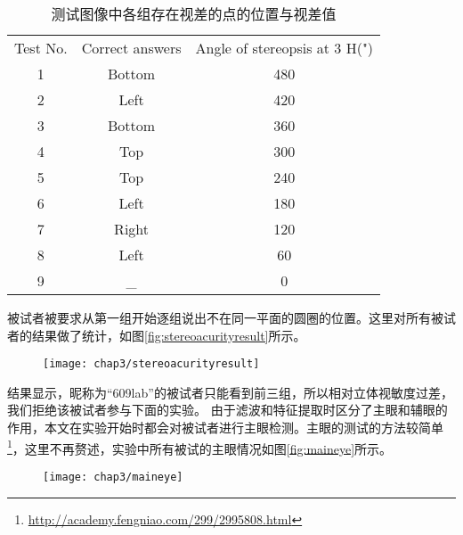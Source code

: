 \begin{table}[]
\centering
\caption{测试图像中各组存在视差的点的位置与视差值}
\label{tab:correctanswer}
\begin{tabular}{|c|c|c|}
\hline
\multirow{2}{*}{Test No.} & \multirow{2}{*}{Correct answers} & \multirow{2}{*}{Angle of stereopsis at 3 H(")} \\
                          &                                  &                                                \\ \hline
1                         & Bottom                           & 480                                            \\ \hline
2                         & Left                             & 420                                            \\ \hline
3                         & Bottom                           & 360                                            \\ \hline
4                         & Top                              & 300                                            \\ \hline
5                         & Top                              & 240                                            \\ \hline
6                         & Left                             & 180                                            \\ \hline
7                         & Right                            & 120                                            \\ \hline
8                         & Left                             & 60                                             \\ \hline
9                         & \_                               & 0                                              \\ \hline
\end{tabular}
\end{table}
被试者被要求从第一组开始逐组说出不在同一平面的圆圈的位置。这里对所有被试者的结果做了统计，如图\ref{fig:stereoacurityresult}所示。
\begin{figure}[ht]
  \centering
  \texttt{[image: chap3/stereoacurityresult]}
\end{figure}
结果显示，昵称为“609lab”的被试者只能看到前三组，所以相对立体视敏度过差，我们拒绝该被试者参与下面的实验。
由于滤波和特征提取时区分了主眼和辅眼的作用，本文在实验开始时都会对被试者进行主眼检测。主眼的测试的方法较简单\footnote{\url{http://academy.fengniao.com/299/2995808.html}}，这里不再赘述，实验中所有被试的主眼情况如图\ref{fig:maineye}所示。
\begin{figure}[!htp]
  \centering
  \texttt{[image: chap3/maineye]}
\end{figure}
